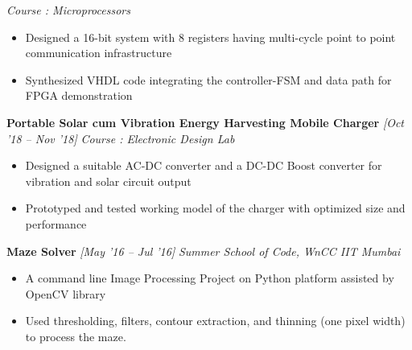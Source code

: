 \documentclass[10 pt]{article}%
\begin{document}
{{{{{	\vspace{-0.8em}
	{\flushleft \em{Course : Microprocessors}}
	\vspace{-5pt}
	\begin{itemize}[leftmargin=*]
		\setlength\itemsep{1.5pt}
\setlength\parskip{1.5pt}
		\item Designed a 16-bit system with 8 registers having multi-cycle point to point communication infrastructure
		\item Synthesized VHDL code integrating the controller-FSM and data path for FPGA demonstration
	\end{itemize}
{\flushleft \textbf {\large{Portable Solar cum Vibration Energy Harvesting Mobile Charger}} \hfill {{{\em{[Oct '18 – Nov '18]}}}}
	\vspace{-0.8em}
	{\flushleft \em{Course : Electronic Design Lab}}
	\vspace{-5pt}
	\begin{itemize}[leftmargin=*]
		\setlength\itemsep{1.5pt}
		\setlength\parskip{1.5pt}
			\item Designed a suitable AC-DC converter and a DC-DC Boost converter for vibration and solar circuit output
			\item Prototyped and tested working model of the charger with optimized size and performance
		\end{itemize}
{\flushleft \textbf {\large{Maze Solver}} \hfill {{{\em{[May '16 – Jul '16]}}}}
	\vspace{-0.8em}
	{\flushleft \em{Summer School of Code, WnCC IIT Mumbai}}
	\vspace{-5pt}
	\begin{itemize}[leftmargin=*]
		\setlength\itemsep{1.5pt}
		\setlength\parskip{1.5pt}
		\item A command line Image Processing Project on Python platform assisted by OpenCV library
		\item Used thresholding, filters, contour extraction, and thinning (one pixel width) to process the maze.
	\end{itemize}



}}}}}}}
\end{document}
